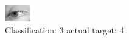 \begin{figure}[h!]
\begin{center}
\includegraphics[width=0.60\columnwidth]{figures/ID2925_class_3_target_4.png}
\end{center}
\caption{ Classification: 3 actual target: 4}
\label{fig:ID2925_class_3_target_4}
\end{figure}
